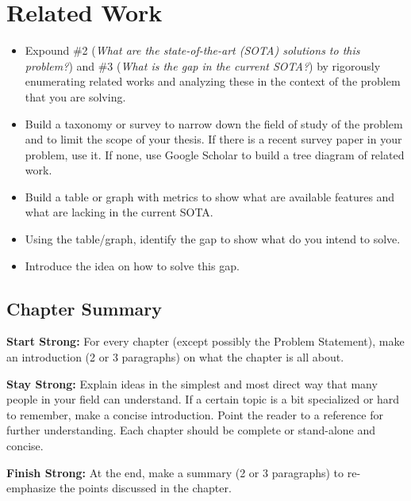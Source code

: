 \chapter{Related Work}
\label{ch:related-work}

\begin{itemize}
    \item Expound \#2 (\emph{What are the state-of-the-art (SOTA) solutions to this problem?}) and \#3 (\emph{What is the gap in the current SOTA?}) by rigorously enumerating related works and analyzing these in the context of the problem that you are solving.
    \item Build a taxonomy or survey to narrow down the field of study of the problem and to limit the scope of your thesis. If there is a recent survey paper in your problem, use it. If none, use Google Scholar to build a tree diagram of related work.
    \item Build a table or graph with metrics to show what are available features and what are lacking in the current SOTA.
    \item Using the table/graph, identify the gap to show what do you intend to solve.
    \item Introduce the idea on how to solve this gap.
\end{itemize}

\section{Chapter Summary}

\textbf{Start Strong:} For every chapter (except possibly the Problem Statement), make an introduction (2 or 3 paragraphs) on what the chapter is all about.

\textbf{Stay Strong:} Explain ideas in the simplest and most direct way that many people in your field can understand. If a certain topic is a bit specialized or hard to remember, make a concise introduction. Point the reader to a reference for further understanding. Each chapter should be complete or stand-alone and concise.

\textbf{Finish Strong:} At the end, make a summary (2 or 3 paragraphs) to re-emphasize the points discussed in the chapter.

